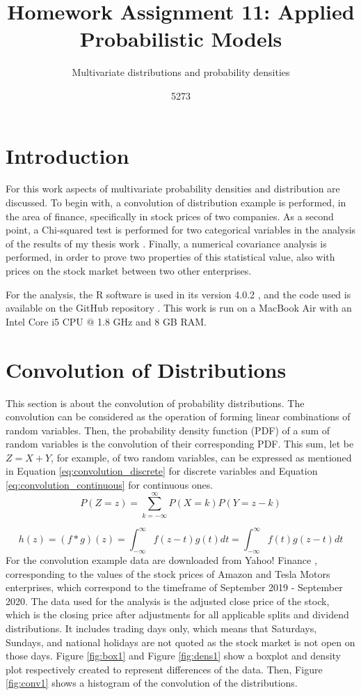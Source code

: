 \documentclass[10pt,leter,openany]{article}
\author{5273}
\title{Homework Assignment 11: Applied Probabilistic Models}
\subtitle{Multivariate distributions and probability densities}
\date{}
\begin{document}
	
\maketitle

\section{Introduction}
 	For this work aspects of multivariate probability densities and distribution are discussed. To begin with, a convolution of distribution example is performed, in the area of finance, specifically in stock prices of two companies. As a second point, a Chi-squared test is performed for two categorical variables in the analysis of the results of my thesis work \citep{hernandez2020study}. Finally, a numerical covariance analysis is performed, in order to prove two properties of this statistical value, also with prices on the stock market between two other enterprises.
 	
 	For the analysis, the R software is used in its version 4.0.2 \citep{r}, and the code used is available on the GitHub repository \citep{github}. This work is run on a MacBook Air with an Intel Core i5 CPU $ @ $ 1.8 GHz and 8 GB RAM.

\section{Convolution of Distributions}
	 This section is about the convolution of probability distributions. The convolution can be considered as the operation of forming linear combinations of random variables. Then, the probability density function (PDF) of a sum of random variables is the convolution of their corresponding PDF. This sum, let be $ Z = X + Y$, for example, of two random variables, can be expressed as mentioned in Equation \ref{eq:convolution_discrete} for discrete variables and Equation \ref {eq:convolution_continuous} for continuous ones.
		\begin{equation} \label{eq:convolution_discrete}
			P(Z=z) = \displaystyle\sum_{k=-\infty}^{\infty} P(X=k)P(Y=z-k)
		\end{equation}
	
		\begin{equation} \label{eq:convolution_continuous}
			h(z) = (f*g)(z) = \displaystyle \int_{-\infty}^{\infty}f(z-t)g(t)dt = \displaystyle\int_{-\infty}^{\infty}f(t)g(z-t)dt
		\end{equation}
	For the convolution example data are downloaded from Yahoo! Finance \citep{yahoo}, corresponding to the values of the stock prices of Amazon and Tesla Motors enterprises, which correspond to the timeframe of September 2019 - September 2020. The data used for the analysis is the adjusted close price of the stock, which is the closing price after adjustments for all applicable splits and dividend distributions.  It includes trading days only, which means that Saturdays, Sundays, and national holidays are not quoted as the stock market is not open on those days. Figure \ref{fig:box1} and Figure \ref{fig:dens1} show a boxplot and density plot respectively created to represent differences of the data. Then, Figure \ref{fig:conv1} shows a histogram of the convolution of the distributions.
	
\end{document}
